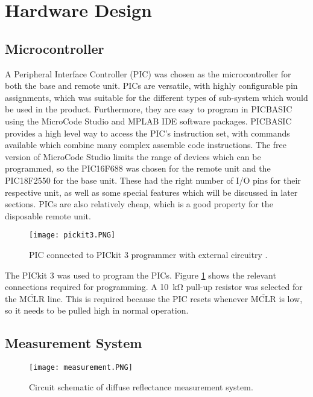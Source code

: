 \section{Hardware Design}

\subsection{Microcontroller}
A Peripheral Interface Controller (PIC) was chosen as the microcontroller for both the base and remote unit. PICs are versatile, with highly configurable pin assignments, which was suitable for the different types of sub-system which would be used in the product. Furthermore, they are easy to program in PICBASIC using the MicroCode Studio and MPLAB IDE software packages. PICBASIC provides a high level way to access the PIC's instruction set, with commands available which combine many complex assemble code instructions. The free version of MicroCode Studio limits the range of devices which can be programmed, so the PIC16F688 \cite{pic16f688} was chosen for the remote unit and the PIC18F2550 \cite{pic18f2550} for the base unit. These had the right number of I/O pins for their respective unit, as well as some special features which will be discussed in later sections. PICs are also relatively cheap, which is a good property for the disposable remote unit.\\

\begin{figure}[htbp]
	\centering
	\texttt{[image: pickit3.PNG]}
	\caption{PIC connected to PICkit 3 programmer with external circuitry \cite{pickit3}.}
	\label{fig: pickit3}
\end{figure}

The PICkit 3 \cite{pickit3} was used to program the PICs. Figure \ref{fig: pickit3} shows the relevant connections required for programming. A \SI{10}{\kilo\ohm} pull-up resistor was selected for the $\overline{\text{MCLR}}$ line. This is required because the PIC resets whenever $\overline{\text{MCLR}}$ is low, so it needs to be pulled high in normal operation. \\



\subsection{Measurement System}
\begin{figure}[htbp]
	\centering
	\texttt{[image: measurement.PNG]}
	\caption{Circuit schematic of diffuse reflectance measurement system.}
	\label{fig: measurement schematic}
\end{figure}

